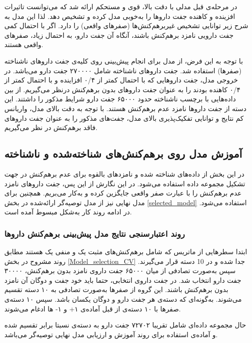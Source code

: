 در مرحله‌ی قبل مدلی با دقت بالا، قوی و مستحکم ارائه شد که می‌توانست تاثیرات افزینده و کاهنده جفت داروها را به‌خوبی مدل کرده و تشخیص دهد. لذا این مدل به شرح زیر توانایی تشخیص غیربرهم‌کنش‌ها (صفرهای واقعی) را دارد. اگر با احتمال کمی جفت دارویی نامزد برهم‌کنش باشند، آنگاه آن جفت دارو، به احتمال زیاد، صفرهای واقعی هستند.

با توجه به این فرض، از مدل برای انجام پیش‌بینی روی کلیه‌ی جفت داروهای ناشناخته (صفرها) استفاده ‌شد. جفت داروهای ناشناخته شامل ۲۷۰۰۰۰ جفت دارو می‌باشد. در خروجی مدل، جفت داروهایی که با احتمال کمتر از ۰/۴ افزاینده و با احتمال کمتر از ۰/۴ کاهنده بودند را به  عنوان جفت داروهای بدون برهم‌کنش درنظر می‌گیریم. از بین داده‌هایی با برچسب ناشناخته حدود ۶۵۰۰۰ جفت دارو شرایط مذکور را داشتند. این دسته از جفت داروها نامزد عدم برهم‌کنش هستند. با توجه به دقت بالای مدل، واریانس کم نتایج و توانایی تفکیک‌پذیری بالای مدل، جفت‌های مذکور را به عنوان جفت داروهای فاقد برهم‌کنش در نظر می‌گیریم.

\subsection{آموزش مدل روی برهم‌کنش‌های شناخته‌شده و ناشناخته}

در این بخش از داده‌های شناخته شده و نامزدهای بالقوه برای عدم برهم‌کنش در جهت تشکیل مجموعه داده استفاده می‌شود. در این نگارش از این پس، جفت داروهای نامزد عدم برهم‌کنش را با عبارت صفر واقعی جایگزین کرده و به‌کار می‌بریم. همچنین برای مدل نهایی نیز از مدل توصیه‌گر ارائه‌شده در بخش
\ref{selected_model}
استفاده می‌شود. در ادامه روند کار به‌شکل مبسوط آمده است.

\subsubsection{روند اعتبارسنجی نتایج مدل پیش‌بینی برهم‌کنش داروها}
ابتدا سطرهایی از ماتریس
که شامل برهم‌کنش‌‌‌های مثبت یک و منفی یک هستند مطابق روند مشروح در بخش
\ref{Model_selection_CV}
جدا شده و در 10 دسته قرار می‌گیرند. سپس به‌صورت تصادفی از میان ۶۵۰۰۰ جفت داروی نامزد بدون برهم‌کنش، ۳۰۰۰۰ جفت دارو انتخاب شد. در جفت داروی انتخابی، حتما باید خود جفت و دوگان آن نامزد بدون برهم‌کنش باشند. این گروه از صفرها به‌صورت تصادفی به ۱۰ دسته تقسیم می‌شوند. به‌گونه‌ای که دسته‌ی هر جفت دارو و دوگان یکسان باشد. سپس ۱۰ دسته‌ی صفرها با ۱۰ دسته‌ی از قبل آماده‌ی ۱+ و ۱- ها ادغام می‌شوند. 
 
حال مجموعه داده‌ای شامل تقریبا ۷۲۷۰۲ جفت دارو به دسته‌ی نسبتا برابر تقسیم شده و آماده‌ی استفاده برای روند آموزش و ارزیابی مدل نهایی توصیه‌گر می‌باشد.

